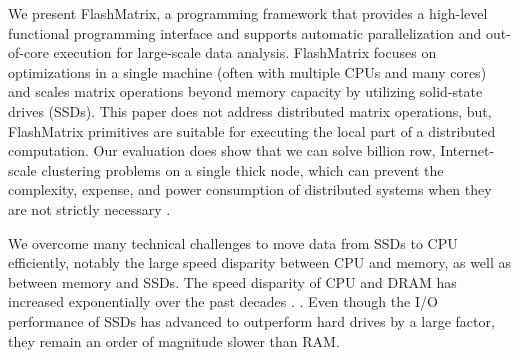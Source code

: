 

We present FlashMatrix, a programming framework that provides a high-level
functional programming interface and supports automatic
parallelization and out-of-core execution for large-scale data analysis.
FlashMatrix focuses on optimizations in a single machine (often with multiple
CPUs and many cores) and scales matrix operations beyond memory capacity by 
utilizing solid-state drives (SSDs).  
This paper does not address distributed matrix operations, but, 
FlashMatrix primitives are suitable for executing the local part of a distributed 
computation.   
Our evaluation does show that we can solve billion row, Internet-scale 
clustering problems on a single thick node, which can prevent the complexity,
expense, and power consumption of distributed systems when they are not strictly necessary
\cite{hotos}.








We overcome many technical challenges to move data from SSDs to CPU efficiently,
notably the large speed disparity between CPU and memory, as well as between
memory and SSDs. The speed disparity of CPU and DRAM has increased exponentially
over the past decades \cite{Wilkes01}. .
Even though the I/O performance of SSDs
has advanced to outperform hard drives by a large factor, they remain an order
of magnitude slower than RAM.  

